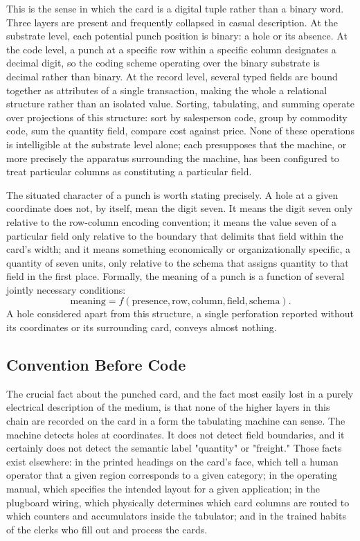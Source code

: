 \documentclass[11pt]{article}
\begin{document}
This is the sense in which the card is a digital tuple rather than a binary word. Three layers are present and frequently collapsed in casual description. At the substrate level, each potential punch position is binary: a hole or its absence. At the code level, a punch at a specific row within a specific column designates a decimal digit, so the coding scheme operating over the binary substrate is decimal rather than binary. At the record level, several typed fields are bound together as attributes of a single transaction, making the whole a relational structure rather than an isolated value. Sorting, tabulating, and summing operate over projections of this structure: sort by salesperson code, group by commodity code, sum the quantity field, compare cost against price. None of these operations is intelligible at the substrate level alone; each presupposes that the machine, or more precisely the apparatus surrounding the machine, has been configured to treat particular columns as constituting a particular field.

The situated character of a punch is worth stating precisely. A hole at a given coordinate does not, by itself, mean the digit seven. It means the digit seven only relative to the row-column encoding convention; it means the value seven of a particular field only relative to the boundary that delimits that field within the card's width; and it means something economically or organizationally specific, a quantity of seven units, only relative to the schema that assigns quantity to that field in the first place. Formally, the meaning of a punch is a function of several jointly necessary conditions:
\[
\text{meaning} = f(\text{presence}, \text{row}, \text{column}, \text{field}, \text{schema}).
\]
A hole considered apart from this structure, a single perforation reported without its coordinates or its surrounding card, conveys almost nothing.

\subsection{Convention Before Code}

The crucial fact about the punched card, and the fact most easily lost in a purely electrical description of the medium, is that none of the higher layers in this chain are recorded on the card in a form the tabulating machine can sense. The machine detects holes at coordinates. It does not detect field boundaries, and it certainly does not detect the semantic label "quantity" or "freight." Those facts exist elsewhere: in the printed headings on the card's face, which tell a human operator that a given region corresponds to a given category; in the operating manual, which specifies the intended layout for a given application; in the plugboard wiring, which physically determines which card columns are routed to which counters and accumulators inside the tabulator; and in the trained habits of the clerks who fill out and process the cards.
\end{document}
